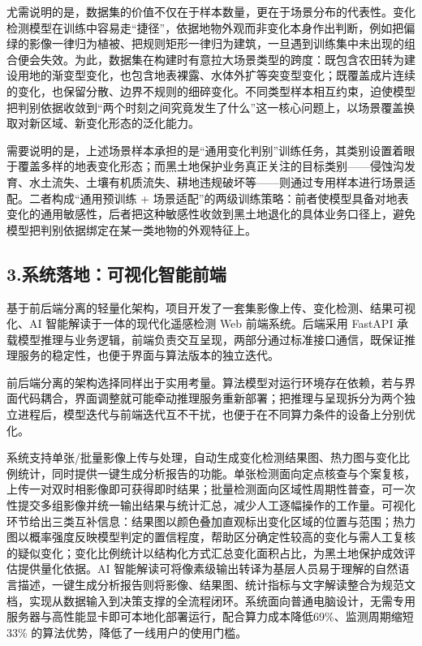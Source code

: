 \documentclass[12pt, a4paper]{ctexart}
\begin{document}
尤需说明的是，数据集的价值不仅在于样本数量，更在于场景分布的代表性。变化检测模型在训练中容易走“捷径”，依据地物外观而非变化本身作出判断，例如把偏绿的影像一律归为植被、把规则矩形一律归为建筑，一旦遇到训练集中未出现的组合便会失效。为此，数据集在构建时有意拉大场景类型的跨度：既包含农田转为建设用地的渐变型变化，也包含地表裸露、水体外扩等突变型变化；既覆盖成片连续的变化，也保留分散、边界不规则的细碎变化。不同类型样本相互约束，迫使模型把判别依据收敛到“两个时刻之间究竟发生了什么”这一核心问题上，以场景覆盖换取对新区域、新变化形态的泛化能力。

需要说明的是，上述场景样本承担的是“通用变化判别”训练任务，其类别设置着眼于覆盖多样的地表变化形态；而黑土地保护业务真正关注的目标类别——侵蚀沟发育、水土流失、土壤有机质流失、耕地违规破坏等——则通过专用样本进行场景适配。二者构成“通用预训练 + 场景适配”的两级训练策略：前者使模型具备对地表变化的通用敏感性，后者把这种敏感性收敛到黑土地退化的具体业务口径上，避免模型把判别依据绑定在某一类地物的外观特征上。

\subsection{3.系统落地：可视化智能前端}

基于前后端分离的轻量化架构，项目开发了一套集影像上传、变化检测、结果可视化、AI 智能解读于一体的现代化遥感检测 Web 前端系统。后端采用 FastAPI 承载模型推理与业务逻辑，前端负责交互呈现，两部分通过标准接口通信，既保证推理服务的稳定性，也便于界面与算法版本的独立迭代。

前后端分离的架构选择同样出于实用考量。算法模型对运行环境存在依赖，若与界面代码耦合，界面调整就可能牵动推理服务重新部署；把推理与呈现拆分为两个独立进程后，模型迭代与前端迭代互不干扰，也便于在不同算力条件的设备上分别优化。

系统支持单张/批量影像上传与处理，自动生成变化检测结果图、热力图与变化比例统计，同时提供一键生成分析报告的功能。单张检测面向定点核查与个案复核，上传一对双时相影像即可获得即时结果；批量检测面向区域性周期性普查，可一次性提交多组影像并统一输出结果与统计汇总，减少人工逐幅操作的工作量。可视化环节给出三类互补信息：结果图以颜色叠加直观标出变化区域的位置与范围；热力图以概率强度反映模型判定的置信程度，帮助区分确定性较高的变化与需人工复核的疑似变化；变化比例统计以结构化方式汇总变化面积占比，为黑土地保护成效评估提供量化依据。AI 智能解读可将像素级输出转译为基层人员易于理解的自然语言描述，一键生成分析报告则将影像、结果图、统计指标与文字解读整合为规范文档，实现从数据输入到决策支撑的全流程闭环。系统面向普通电脑设计，无需专用服务器与高性能显卡即可本地化部署运行，配合算力成本降低69\%、监测周期缩短33\% 的算法优势，降低了一线用户的使用门槛。
\end{document}
